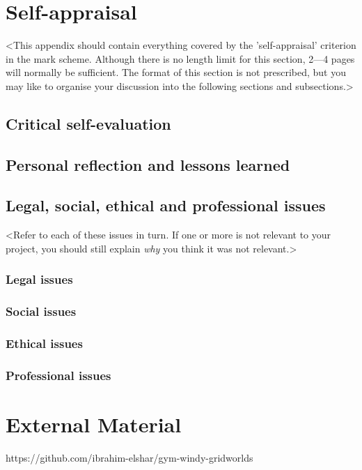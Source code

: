 \begin{appendices}

%
%
\chapter{Self-appraisal}

<This appendix should contain everything covered by the 'self-appraisal' criterion in the mark scheme. Although there is no length limit for this section, 2---4 pages will normally be sufficient. The format of this section is not prescribed, but you may like to organise your discussion into the following sections and subsections.>

\section{Critical self-evaluation}

\section{Personal reflection and lessons learned}

\section{Legal, social, ethical and professional issues}

<Refer to each of these issues in turn. If one or more is not relevant to your project, you should still explain {\em why} you think it was not relevant.>

\subsection{Legal issues}

\subsection{Social issues}

\subsection{Ethical issues}

\subsection{Professional issues}


%
%
\chapter{External Material}
https://github.com/ibrahim-elshar/gym-windy-gridworlds


%
%



\end{appendices}
